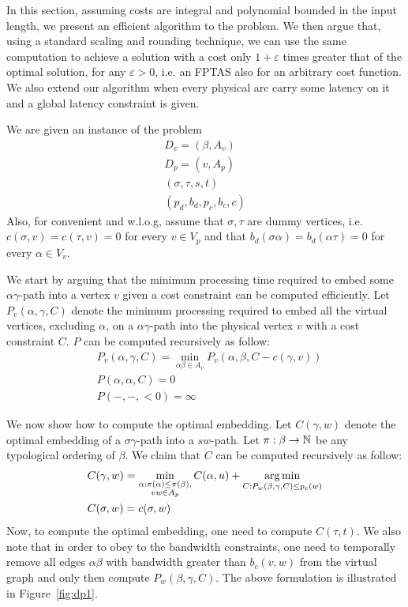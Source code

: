 In this section, 
assuming costs are integral and polynomial bounded in the input length,
we present an efficient algorithm to the \VPN{} problem.
We then argue that, using a standard scaling and rounding technique, we can use
the same computation to achieve a solution with a cost only
$1 + \varepsilon$ times greater that of the optimal solution, for any
$\varepsilon > 0$, i.e. an FPTAS also for an arbitrary cost function.
We also extend our algorithm when every physical arc carry some latency on it
and a global latency constraint is given.

We are given an instance of the \VPN{} problem 
\begin{align*}
D_v = (\beta , A_v)		\\
D_p = (v, A_p)		\\
(\sigma , \tau , s, t)	\\
(p_d, b_d, p_c, b_c, c)
\end{align*}
Also, for convenient and w.l.o.g, assume that $\sigma , \tau $ are dummy vertices, 
i.e. $c(\sigma , v) = c(\tau , v) = 0$ for every $v \in V_p$ and that
$b_d(\sigma\alpha) = b_d(\alpha\tau) = 0$ for every $\alpha \in V_v$.

We start by arguing that the minimum processing time required to embed some
$\alpha \gamma $-path into a vertex $v$ given a cost constraint can be computed
efficiently.
Let $P_{v}(\alpha , \gamma , C)$ denote the minimum processing required to embed
all the virtual vertices, excluding $\alpha $, on a $\alpha \gamma $-path into the physical
vertex $v$ with a cost constraint $C$.
$P$ can be computed recursively as follow:
\begin{align*}
&P_{v}(\alpha , \gamma , C) = 
\min_{\alpha \beta  \in A_v} P_{v}(\alpha , \beta , C - c(\gamma , v))
\\
&P(\alpha , \alpha , C) = 0
\\
&P(-, -, <0) = \infty
\end{align*}
 
We now show how to compute the optimal embedding.
Let $C(\gamma , w)$ denote the
optimal embedding of a $\sigma \gamma $-path into a $sw$-path.
Let $\pi:\beta  \to \mathbb{N}$ be any typological ordering of $\beta $. 
We claim that $C$ can be computed recursively as follow:
\begin{align*}
&C(\gamma , w) = 
\min_{\substack{
\alpha  : \pi(\alpha ) \leq \pi(\beta ), 
\\
vw \in A_p
}}
C(\alpha , u)
+
\operatorname*{arg\,min}_{C : P_{w}(\beta , \gamma , C) \leq p_c(w)}
\\
&C(\sigma , w) = c(\sigma , w)
\end{align*}
Now, to compute the optimal embedding, one need to compute $C(\tau , t)$. 
We also note that in order to obey to the bandwidth constraints, 
one need to temporally remove all edges $\alpha \beta $ with bandwidth greater than
$b_c(v, w)$ from the virtual graph and only then compute $P_{w}(\beta , \gamma , C)$.
The above formulation is illustrated in Figure~\ref{fig:dp1}.

